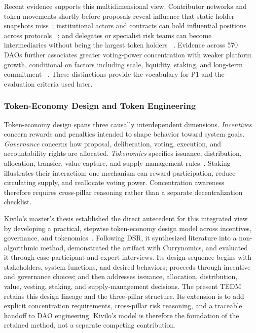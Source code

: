 \documentclass[referee,sn-basic]{sn-jnl}
\begin{document}
Recent evidence supports this multidimensional view. Contributor networks and
token movements shortly before proposals reveal influence that static holder
snapshots miss~\cite{Kitzler2025Governance}; institutional actors and contracts
can hold influential positions across protocols
~\cite{Eisermann2025Concentration}; and delegates or specialist risk teams can
become intermediaries without being the largest token holders
~\cite{Feulner2025Beyond}. Evidence across 570 DAOs further associates greater
voting-power concentration with weaker platform growth, conditional on factors
including scale, liquidity, staking, and long-term commitment
~\cite{Han2026DAOGovernance}. These distinctions provide the vocabulary for P1
and the evaluation criteria used later.

\subsubsection{Token-Economy Design and Token Engineering}\label{subsec:design-engineering}

Token-economy design spans three causally interdependent dimensions.
\emph{Incentives} concern rewards and penalties intended to shape behavior
toward system goals. \emph{Governance} concerns how proposal, deliberation,
voting, execution, and accountability rights are allocated. \emph{Tokenomics}
specifies issuance, distribution, allocation, transfer, value capture, and
supply-management rules~\cite{Benedetti2023}. Staking illustrates their
interaction: one mechanism can reward participation, reduce circulating
supply, and reallocate voting power. Concentration awareness therefore requires
cross-pillar reasoning rather than a separate decentralization checklist.

Kivilo's master's thesis established the direct antecedent for this integrated
view by developing a practical, stepwise token-economy design model across
incentives, governance, and tokenomics~\cite{Kivilo2023TokenEconomy}. Following
DSR, it synthesized literature into a non-algorithmic method, demonstrated the
artifact with Currynomics, and evaluated it through case-participant and expert
interviews. Its design sequence begins with stakeholders, system functions, and
desired behaviors; proceeds through incentive and governance choices; and then
addresses issuance, allocation, distribution, value, vesting, staking, and
supply-management decisions. The present TEDM retains this design lineage and
the three-pillar structure. Its extension is to add explicit concentration
requirements, cross-pillar risk reasoning, and a traceable handoff to DAO
engineering. Kivilo's model is therefore the foundation of the retained method,
not a separate competing contribution.
\end{document}
